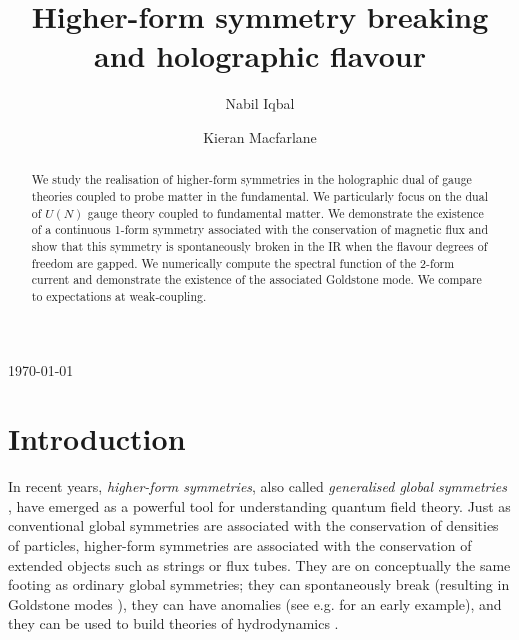 \documentclass[aps,preprint,nofootinbib,preprintnumbers,eqsecnum,superscriptaddress]{revtex4}
\begin{document}
\title {Higher-form symmetry breaking and holographic flavour}
\author{Nabil Iqbal}
\author{Kieran Macfarlane}
\begin{abstract}
We study the realisation of higher-form symmetries in the holographic dual of gauge theories coupled to probe matter in the fundamental. We particularly focus on the dual of $U(N)$ gauge theory coupled to fundamental matter. We demonstrate the existence of a continuous 1-form symmetry associated with the conservation of magnetic flux and show that this symmetry is spontaneously broken in the IR when the flavour degrees of freedom are gapped. We numerically compute the spectral function of the 2-form current and demonstrate the existence of the associated Goldstone mode. We compare to expectations at weak-coupling. 

\end{abstract}
\vfill
\today

\maketitle
\tableofcontents
\pagebreak
\section{Introduction} \label{sec:intro}
In recent years, \textit{higher-form symmetries}, also called \textit{generalised global symmetries} \cite{Gaiotto:2014kfa}, have emerged as a powerful tool for understanding quantum field theory. Just as conventional global symmetries are associated with the conservation of densities of particles, higher-form symmetries are associated with the conservation of extended objects such as strings or flux tubes. They are on conceptually the same footing as ordinary global symmetries; they can spontaneously break (resulting in Goldstone modes \cite{Hofman:2018lfz,Lake:2018dqm}), they can have anomalies (see e.g. \cite{Gaiotto:2017yup} for an early example), and they can be used to build theories of hydrodynamics \cite{Grozdanov:2016tdf,Glorioso:2018kcp,Armas:2018atq}. 
\end{document}
